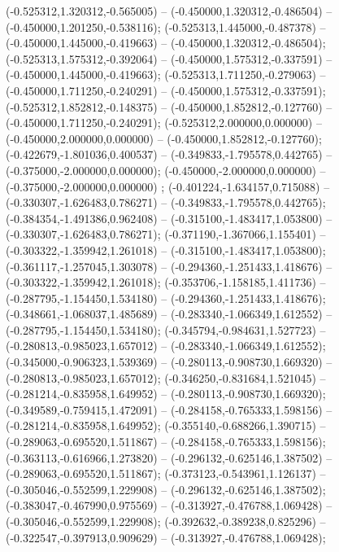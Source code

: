  (-0.525312,1.320312,-0.565005) -- (-0.450000,1.320312,-0.486504) -- (-0.450000,1.201250,-0.538116);
 (-0.525313,1.445000,-0.487378) -- (-0.450000,1.445000,-0.419663) -- (-0.450000,1.320312,-0.486504);
 (-0.525313,1.575312,-0.392064) -- (-0.450000,1.575312,-0.337591) -- (-0.450000,1.445000,-0.419663);
 (-0.525313,1.711250,-0.279063) -- (-0.450000,1.711250,-0.240291) -- (-0.450000,1.575312,-0.337591);
 (-0.525312,1.852812,-0.148375) -- (-0.450000,1.852812,-0.127760) -- (-0.450000,1.711250,-0.240291);
 (-0.525312,2.000000,0.000000) -- (-0.450000,2.000000,0.000000) -- (-0.450000,1.852812,-0.127760);
 (-0.422679,-1.801036,0.400537) -- (-0.349833,-1.795578,0.442765) -- (-0.375000,-2.000000,0.000000);
 (-0.450000,-2.000000,0.000000) -- (-0.375000,-2.000000,0.000000) ;
 (-0.401224,-1.634157,0.715088) -- (-0.330307,-1.626483,0.786271) -- (-0.349833,-1.795578,0.442765);
 (-0.384354,-1.491386,0.962408) -- (-0.315100,-1.483417,1.053800) -- (-0.330307,-1.626483,0.786271);
 (-0.371190,-1.367066,1.155401) -- (-0.303322,-1.359942,1.261018) -- (-0.315100,-1.483417,1.053800);
 (-0.361117,-1.257045,1.303078) -- (-0.294360,-1.251433,1.418676) -- (-0.303322,-1.359942,1.261018);
 (-0.353706,-1.158185,1.411736) -- (-0.287795,-1.154450,1.534180) -- (-0.294360,-1.251433,1.418676);
 (-0.348661,-1.068037,1.485689) -- (-0.283340,-1.066349,1.612552) -- (-0.287795,-1.154450,1.534180);
 (-0.345794,-0.984631,1.527723) -- (-0.280813,-0.985023,1.657012) -- (-0.283340,-1.066349,1.612552);
 (-0.345000,-0.906323,1.539369) -- (-0.280113,-0.908730,1.669320) -- (-0.280813,-0.985023,1.657012);
 (-0.346250,-0.831684,1.521045) -- (-0.281214,-0.835958,1.649952) -- (-0.280113,-0.908730,1.669320);
 (-0.349589,-0.759415,1.472091) -- (-0.284158,-0.765333,1.598156) -- (-0.281214,-0.835958,1.649952);
 (-0.355140,-0.688266,1.390715) -- (-0.289063,-0.695520,1.511867) -- (-0.284158,-0.765333,1.598156);
 (-0.363113,-0.616966,1.273820) -- (-0.296132,-0.625146,1.387502) -- (-0.289063,-0.695520,1.511867);
 (-0.373123,-0.543961,1.126137) -- (-0.305046,-0.552599,1.229908) -- (-0.296132,-0.625146,1.387502);
 (-0.383047,-0.467990,0.975569) -- (-0.313927,-0.476788,1.069428) -- (-0.305046,-0.552599,1.229908);
 (-0.392632,-0.389238,0.825296) -- (-0.322547,-0.397913,0.909629) -- (-0.313927,-0.476788,1.069428);
